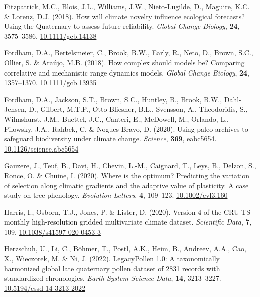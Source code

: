 \documentclass[11pt,]{article}
\newlength{\cslhangindent}
\newenvironment{CSLReferences}[2] %
 {%
  \setlength{\parindent}{0pt}
  \ifodd #1 \everypar{\setlength{\hangindent}{\cslhangindent}}\ignorespaces\fi
  \ifnum #2 > 0
  \setlength{\parskip}{#2\baselineskip}
  \fi
 }%
 {}
\begin{document}
\begin{CSLReferences}{1}{0}
\leavevmode{}%
Fitzpatrick, M.C., Blois, J.L., Williams, J.W., Nieto-Lugilde, D.,
Maguire, K.C. \& Lorenz, D.J. (2018). How will climate novelty influence
ecological forecasts? {Using} the {Quaternary} to assess future
reliability. \emph{Global Change Biology}, \textbf{24}, 3575--3586.
\href{https://doi.org/10.1111/gcb.14138}{10.1111/gcb.14138}

\leavevmode{}%
Fordham, D.A., Bertelsmeier, C., Brook, B.W., Early, R., Neto, D.,
Brown, S.C., Ollier, S. \& Araújo, M.B. (2018). How complex should
models be? {Comparing} correlative and mechanistic range dynamics
models. \emph{Global Change Biology}, \textbf{24}, 1357--1370.
\href{https://doi.org/10.1111/gcb.13935}{10.1111/gcb.13935}

\leavevmode{}%
Fordham, D.A., Jackson, S.T., Brown, S.C., Huntley, B., Brook, B.W.,
Dahl-Jensen, D., Gilbert, M.T.P., Otto-Bliesner, B.L., Svensson, A.,
Theodoridis, S., Wilmshurst, J.M., Buettel, J.C., Canteri, E., McDowell,
M., Orlando, L., Pilowsky, J.A., Rahbek, C. \& Nogues-Bravo, D. (2020).
Using paleo-archives to safeguard biodiversity under climate change.
\emph{Science}, \textbf{369}, eabc5654.
\href{https://doi.org/10.1126/science.abc5654}{10.1126/science.abc5654}

\leavevmode{}%
Gauzere, J., Teuf, B., Davi, H., Chevin, L.-M., Caignard, T., Leys, B.,
Delzon, S., Ronce, O. \& Chuine, I. (2020). Where is the optimum?
{Predicting} the variation of selection along climatic gradients and the
adaptive value of plasticity. {A} case study on tree phenology.
\emph{Evolution Letters}, \textbf{4}, 109--123.
\href{https://doi.org/10.1002/evl3.160}{10.1002/evl3.160}

\leavevmode{}%
Harris, I., Osborn, T.J., Jones, P. \& Lister, D. (2020). Version 4 of
the {CRU} {TS} monthly high-resolution gridded multivariate climate
dataset. \emph{Scientific Data}, \textbf{7}, 109.
\href{https://doi.org/10.1038/s41597-020-0453-3}{10.1038/s41597-020-0453-3}

\leavevmode{}%
Herzschuh, U., Li, C., Böhmer, T., Postl, A.K., Heim, B., Andreev, A.A.,
Cao, X., Wieczorek, M. \& Ni, J. (2022). LegacyPollen 1.0: A
taxonomically harmonized global late quaternary pollen dataset of 2831
records with standardized chronologies. \emph{Earth System Science
Data}, \textbf{14}, 3213--3227.
\href{https://doi.org/10.5194/essd-14-3213-2022}{10.5194/essd-14-3213-2022}


\end{CSLReferences}
\end{document}
